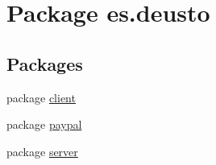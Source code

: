 \hypertarget{namespacees_1_1deusto}{}\section{Package es.\+deusto}
\label{namespacees_1_1deusto}
\subsection*{Packages}
\begin{DoxyCompactItemize}
\item 
package \mbox{\hyperlink{namespacees_1_1deusto_1_1client}{client}}
\item 
package \mbox{\hyperlink{namespacees_1_1deusto_1_1paypal}{paypal}}
\item 
package \mbox{\hyperlink{namespacees_1_1deusto_1_1server}{server}}
\end{DoxyCompactItemize}

